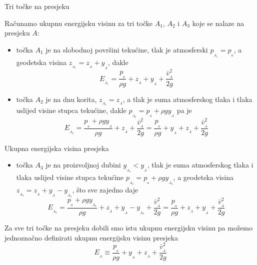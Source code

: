 \documentclass[croatian]{beamer}
\begin{document}
\begin{frame}{Tri točke na presjeku}

Računamo ukupnu energijsku visinu za tri točke $A_{1}$, $A_{2}$
i $A_{3}$ koje se nalaze na presjeku $A$:
\begin{itemize}
\item točka $A_{1}$ je na slobodnoj površini tekućine, tlak je atmosferski
$p_{_{A_{1}}}=p_{_{a}}$, a geodetska visina $z_{_{A_{1}}}=z_{_{A}}+y_{_{A}}$,
dakle
\[
E_{_{A_{1}}}=\frac{p_{_{a}}}{\rho g}+z_{_{A}}+y_{_{A}}+\frac{\bar{v}_{_{A}}^{2}}{2g}
\]
\item točka $A_{2}$ je na dnu korita, $z_{_{A_{2}}}=z_{_{A}}$, a tlak
je suma atmosferskog tlaka i tlaka uslijed visine stupca tekućine,
dakle $p_{_{A_{2}}}=p_{_{a}}+\rho gy_{_{A}}$ pa je 
\[
E_{_{A_{2}}}=\frac{p_{_{a}}+\rho gy_{_{A}}}{\rho g}+z_{_{A}}+\frac{\bar{v}_{_{A}}^{2}}{2g}=\frac{p_{_{a}}}{\rho g}+y_{_{A}}+z_{_{A}}+\frac{\bar{v}_{_{A}}^{2}}{2g}
\]
\end{itemize}
\end{frame}

\begin{frame}{Ukupna energijska visina presjeka}

\begin{itemize}
\item točka $A_{3}$ je na proizvoljnoj dubini $y_{_{A_{3}}}<y_{_{A}}$,
tlak je suma atmosferskog tlaka i tlaka uslijed visine stupca tekućine
$p_{_{A_{3}}}=p_{_{a}}+\rho gy_{_{A_{3}}}$, a geodetska visina $z_{_{A_{3}}}=z_{_{A}}+y_{_{A}}-y_{_{A_{3}}}$,
što sve zajedno daje
\[
E_{_{A_{3}}}=\frac{p_{_{a}}+\rho gy_{_{A_{3}}}}{\rho g}+z_{_{A}}+y_{_{A}}-y_{_{A_{3}}}+\frac{\bar{v}_{_{A}}^{2}}{2g}=\frac{p_{_{a}}}{\rho g}+z_{_{A}}+y_{_{A}}+\frac{\bar{v}_{_{A}}^{2}}{2g}
\]
\end{itemize}
\begin{block}{}
Za sve tri točke na presjeku dobili smo istu ukupnu energijsku visinu
pa možemo jednoznačno definirati \alert{ukupnu energijsku visinu presjeka}\emph{
\[
E_{_{A}}\equiv\frac{p_{_{a}}}{\rho g}+y_{_{A}}+z_{_{A}}+\frac{\bar{v}_{_{A}}^{2}}{2g}
\]
}
\end{block}
\end{frame}
\end{document}
